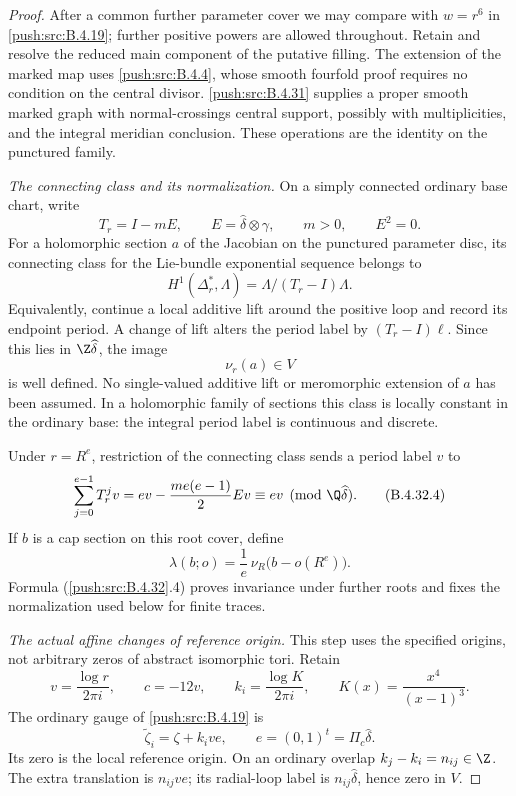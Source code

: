 \begin{proof}
After a common further parameter cover we may compare with
$w=r^6$ in \ref{push:src:B.4.19}; further positive powers are allowed throughout.
Retain and resolve the reduced main component of the putative
filling. The extension of the marked map uses \ref{push:src:B.4.4}, whose
smooth fourfold proof requires no condition on the central
divisor. \ref{push:src:B.4.31} supplies a proper smooth marked graph with
normal-crossings central support, possibly with multiplicities,
and the integral meridian conclusion. These operations are
the identity on the punctured family.

\emph{The connecting class and its normalization.}
On a simply connected ordinary base chart, write
\[
 T_r=I-mE,\qquad
 E=\widehat\delta\otimes\gamma,\qquad m>0,\qquad E^2=0.
 \tag{B.4.32.2}
\]
For a holomorphic section $a$ of the Jacobian on the punctured
parameter disc, its connecting class for the Lie-bundle
exponential sequence belongs to
\[
 H^1(\Delta_r^*,\Lambda)
       =\Lambda/(T_r-I)\Lambda .
\]
Equivalently, continue a local additive lift around the positive
loop and record its endpoint period. A change of lift alters
the period label by $(T_r-I)\ell$. Since this lies in
$\Z\widehat\delta$, the image
\[
 \nu_r(a)\in V
 \tag{B.4.32.3}
\]
is well defined. No single-valued additive lift or meromorphic
extension of $a$ has been assumed. In a holomorphic family of
sections this class is locally constant in the ordinary base:
the integral period label is continuous and discrete.

Under $r=R^e$, restriction of the connecting class sends a
period label $v$ to
\[
 \sum_{j=0}^{e-1}T_r^jv
   =ev-\frac{me(e-1)}2Ev
   \equiv ev\pmod{\Q\widehat\delta}.
 \tag{B.4.32.4}
\]
If $b$ is a cap section on this root cover, define
\[
 \lambda(b;o)=\frac1e\,\nu_R\bigl(b-o(R^e)\bigr).
 \tag{B.4.32.5}
\]
Formula (\ref{push:src:B.4.32}.4) proves invariance under further roots and
fixes the normalization used below for finite traces.

\emph{The actual affine changes of reference origin.}
This step uses the specified origins, not arbitrary zeros of
abstract isomorphic tori. Retain
\[
 v=\frac{\log r}{2\pi i},\qquad c=-12v,\qquad
 k_i=\frac{\log K}{2\pi i},\qquad
 K(x)=\frac{x^4}{(x-1)^3}.
\]
The ordinary gauge of \ref{push:src:B.4.19} is
\[
 \widetilde\zeta_i=\zeta+k_i v e,\qquad
 e=(0,1)^t=\Pi_c\widehat\delta .
 \tag{B.4.32.6}
\]
Its zero is the local reference origin. On an ordinary overlap
$k_j-k_i=n_{ij}\in\Z$. The extra translation is $n_{ij}ve$;
its radial-loop label is $n_{ij}\widehat\delta$, hence zero
in $V$.


\end{proof}
